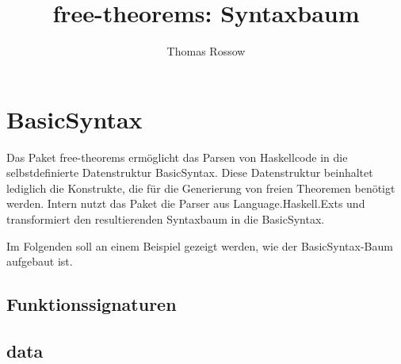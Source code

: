 \documentclass[11pt]{article} %
\title{free-theorems: Syntaxbaum}
\author{Thomas Rossow}
\begin{document}
\maketitle

\section{BasicSyntax}

Das Paket free-theorems ermöglicht das Parsen von Haskellcode in die selbstdefinierte Datenstruktur BasicSyntax. Diese Datenstruktur beinhaltet lediglich die Konstrukte, die für die Generierung von freien Theoremen benötigt werden. Intern nutzt das Paket die Parser aus Language.Haskell.Exts und transformiert den resultierenden Syntaxbaum in die BasicSyntax.

Im Folgenden soll an einem Beispiel gezeigt werden, wie der BasicSyntax-Baum aufgebaut ist.

\subsection{Funktionssignaturen}



\subsection{data}


\end{document}
